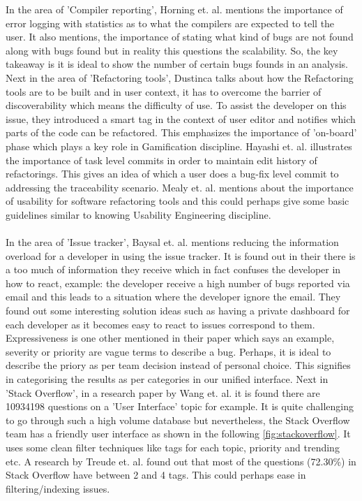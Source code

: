 In the area of 'Compiler reporting', Horning et. al. \cite{horning} mentions the importance of error logging with statistics as to what the compilers are expected to tell the user. It also mentions, the importance of stating what kind of bugs are not found along with bugs found but in reality this questions the scalability. So, the key takeaway is it is ideal to show the number of certain bugs founds in an analysis. Next in the area of 'Refactoring tools', Dustinca \cite{dustinca} talks about how the Refactoring tools are to be built and in user context, it has to overcome the barrier of discoverability which means the difficulty of use. To assist the developer on this issue, they introduced a smart tag in the context of user editor and notifies which parts of the code can be refactored. This emphasizes the importance of 'on-board' phase which plays a key role in Gamification \cite{gamify} discipline. Hayashi et. al. \cite{Hayashi} illustrates the importance of task level commits in order to maintain edit history of refactorings. This gives an idea of which a user does a bug-fix level commit to addressing the traceability scenario. Mealy et. al. \cite{Mealy} mentions about the importance of usability for software refactoring tools and this could perhaps give some basic guidelines similar to knowing Usability Engineering \cite{usability} discipline. \\ \\

In the area of 'Issue tracker', Baysal et. al. \cite{Baysal} mentions reducing the information overload for a developer in using the issue tracker. It is found out in their there is a too much of information they receive which in fact confuses the developer in how to react, example: the developer receive a high number of bugs reported via email and this leads to a situation where the developer ignore the email. They found out some interesting solution ideas such as having a private dashboard for each developer as it becomes easy to react to issues correspond to them. Expressiveness is one other mentioned in their paper which says an example, severity or priority are vague terms to describe a bug. Perhaps, it is ideal to describe the priory as per team decision instead of personal choice.  This signifies in categorising the results as per categories in our unified interface. Next in 'Stack Overflow', in a research paper by Wang et. al. \cite{stack} it is found there are 10934198 questions on a 'User Interface' topic for example. It is quite challenging to go through such a high volume database but nevertheless, the Stack Overflow team has a friendly user interface as shown in the following  \autoref{fig:stackoverflow}. It uses some clean filter techniques like tags for each topic, priority and trending etc. A research by Treude et. al. \cite{Treude.2011} found out that most of the questions (72.30\%) in Stack Overflow have between 2 and 4 tags. This could perhaps ease in filtering/indexing issues. \\ \\

